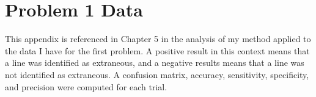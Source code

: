 \appendix
\renewcommand{\thechapter}{A}
\renewcommand{\chaptername}{Appendix}
\chapter{Problem 1 Data}
This appendix is referenced in Chapter 5 in the analysis of my method applied to the data I have for the first problem. A positive result in this context means that a line was identified as extraneous, and a negative results means that a line was not identified as extraneous. A confusion matrix, accuracy, sensitivity, specificity, and precision were computed for each trial. 


































